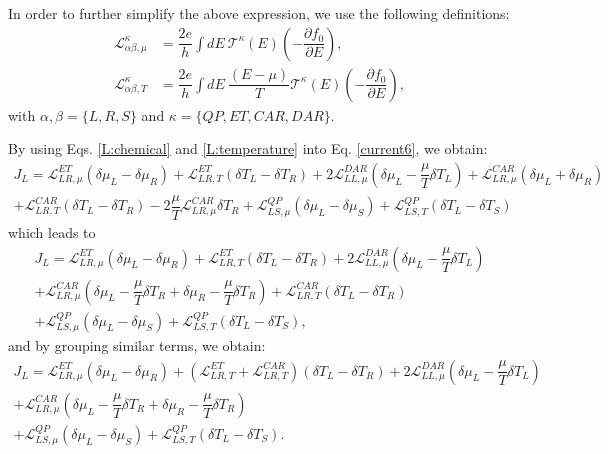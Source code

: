 In order to further simplify the above expression, we use the following definitions:
\begin{align}\label{L:chemical}
\mathcal{L}_{\alpha\beta,\mu}^{\kappa}&=\dfrac{2e}{h}\int dE~\mathcal{T}^{\kappa}(E)
\left(-\dfrac{\partial f_{0}}{\partial E}\right),
\\\label{L:temperature}
\mathcal{L}_{\alpha\beta,T}^{\kappa}&=\dfrac{2e}{h}\int dE~\dfrac{(E-\mu)}{T}\mathcal{T}^{\kappa}(E)
\left(-\dfrac{\partial f_{0}}{\partial E}\right),
\end{align}
with $\alpha,\beta=\{L,R,S\}$ and $\kappa=\{QP,ET,CAR,DAR\}$.

By using Eqs. \eqref{L:chemical} and \eqref{L:temperature} into Eq. \eqref{current6}, we obtain:
\begin{multline*}
J_{L}=
\mathcal{L}_{LR,\mu}^{ET}(\delta\mu_{L}-\delta\mu_{R})
+
\mathcal{L}_{LR,T}^{ET}(\delta T_{L}-\delta T_{R})
+
2\mathcal{L}_{LL,\mu}^{DAR}\left(\delta\mu_{L}-\dfrac{\mu}{T}\delta T_{L}\right)
+
\mathcal{L}_{LR,\mu}^{CAR}(\delta\mu_{L}+\delta\mu_{R})
\\
+
\mathcal{L}_{LR,T}^{CAR}(\delta T_{L}-\delta T_{R})
-
2\dfrac{\mu}{T}\mathcal{L}_{LR,\mu}^{CAR}\delta T_{R}
+
\mathcal{L}^{QP}_{LS,\mu}(\delta\mu_{L}-\delta\mu_{S})
+
\mathcal{L}^{QP}_{LS,T}(\delta T_{L}-\delta T_{S})
\end{multline*}
which leads to
\begin{multline*}
J_{L}=
\mathcal{L}_{LR,\mu}^{ET}(\delta\mu_{L}-\delta\mu_{R})
+
\mathcal{L}_{LR,T}^{ET}(\delta T_{L}-\delta T_{R})
+
2\mathcal{L}_{LL,\mu}^{DAR}\left(\delta\mu_{L}-\dfrac{\mu}{T}\delta T_{L}\right)
\\+
\mathcal{L}_{LR,\mu}^{CAR}\left(\delta\mu_{L}-\dfrac{\mu}{T}\delta T_{R}+\delta\mu_{R}-\dfrac{\mu}{T}\delta T_{R}\right)
+
\mathcal{L}_{LR,T}^{CAR}(\delta T_{L}-\delta T_{R})
\\+
\mathcal{L}^{QP}_{LS,\mu}(\delta\mu_{L}-\delta\mu_{S})
+
\mathcal{L}^{QP}_{LS,T}(\delta T_{L}-\delta T_{S}),
\end{multline*}
and by grouping similar terms, we obtain:
\begin{multline}\label{JL:general}
J_{L}=
\mathcal{L}_{LR,\mu}^{ET}(\delta\mu_{L}-\delta\mu_{R})
+
(\mathcal{L}_{LR,T}^{ET}+\mathcal{L}_{LR,T}^{CAR})(\delta T_{L}-\delta T_{R})
+
2\mathcal{L}_{LL,\mu}^{DAR}\left(\delta\mu_{L}-\dfrac{\mu}{T}\delta T_{L}\right)
\\+
\mathcal{L}_{LR,\mu}^{CAR}\left(\delta\mu_{L}-\dfrac{\mu}{T}\delta T_{R}+\delta\mu_{R}-\dfrac{\mu}{T}\delta T_{R}\right)
\\+
\mathcal{L}^{QP}_{LS,\mu}(\delta\mu_{L}-\delta\mu_{S})
+
\mathcal{L}^{QP}_{LS,T}(\delta T_{L}-\delta T_{S}).
\end{multline}

